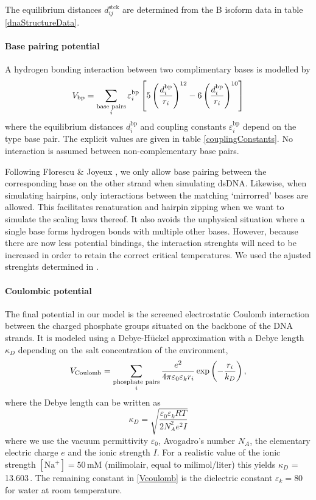 The equilibrium distances $d_{ij}^\text{stck}$ are determined from the B isoform data in table \ref{dnaStructureData}.


\paragraph{Base pairing potential}
A hydrogen bonding interaction between two complimentary bases is modelled by
\begin{equation}
V_\text{bp}
= \sum_{\substack{\text{base pairs}\\i}}
\varepsilon^\text{bp}_i \left[
	  5\left(\frac{d^\text{bp}_i}{r_i} \right)^{12}
	- 6\left(\frac{d^\text{bp}_i}{r_i} \right)^{10}
\right]
\end{equation}
where the equilibrium distances $d^\text{bp}_i$ and coupling constants $\varepsilon^\text{bp}_i$ depend on the type base pair. The explicit values are given in table \ref{couplingConstants}. No interaction is assumed between non-complementary base pairs.

Following Florescu \& Joyeux \cite{florescu2011thermal}, we only allow base pairing between the corresponding base on the other strand when simulating dsDNA. Likewise, when simulating hairpins, only interactions between the matching `mirrorred' bases are allowed. This facilitates renaturation and hairpin zipping when we want to simulate the scaling laws thereof. It also avoids the unphysical situation where a single base forms hydrogen bonds with multiple other bases. However, because there are now less potential bindings, the interaction strenghts will need to be increased in order to retain the correct critical temperatures. We used the ajusted strenghts determined in \cite{florescu2011thermal}.


\paragraph{Coulombic potential}
The final potential in our model is the screened electrostatic Coulomb interaction between the charged phosphate groups situated on the backbone of the DNA strands. It is modeled using a Debye-H\"uckel approximation with a Debye length $\kappa_D$ depending on the salt concentration of the environment,
\begin{equation}
V_\text{Coulomb}
= \sum_{\substack{\text{phosphate pairs}\\i}}
	\frac{e^2}{4 \pi \varepsilon_0 \varepsilon_k r_i}
       		\exp \left(- \frac{r_i}{k_D} \right),
\label{Vcoulomb}
\end{equation}
where the Debye length can be written as
\begin{equation}
\kappa_D
= \sqrt{ \frac{\varepsilon_0 \varepsilon_k RT}{2N^2_A e^2 I}}
\end{equation}
where we use the vacuum permittivity $\varepsilon_0$, Avogadro's number $N_A$, the elementary electric charge $e$ and the ionic strength $I$. For a realistic value of the ionic strength $[\text{Na}^+] = 50$\,mM (milimolair, equal to milimol/liter) this yields $\kappa_D$ = 13.603\,\Angstrom. The remaining constant in \eqref{Vcoulomb} is the dielectric constant $\varepsilon_k = 80$ for water at room temperature.


